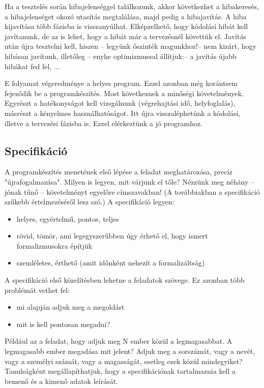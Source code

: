 \documentclass[margin=0px]{article}
\begin{document}
Ha a tesztelés során hibajelenséggel találkozunk, akkor következhet a hibakeresés, a hibajelenséget okozó utasítás megtalálása, majd pedig a hibajavítás. A hiba kijavítása több fázisba is visszanyúlhat. Elképzelhető, hogy kódolási hibát kell javítanunk, de az is lehet, hogy a hibát már a tervezésnél követtük el. Javítás után újra tesztelni kell, hiszen – legyünk őszinték magunkhoz!– nem kizárt, hogy hibásan javítunk, illetőleg – enyhe optimizmussal állítjuk:– a javítás újabb hibákat fed fel, ...

E folyamat végeredménye a helyes program. Ezzel azonban még korántsem fejeződik be a programkészítés. Most következnek a minőségi követelmények. Egyrészt a hatékonyságot kell vizsgálnunk (végrehajtási idő, helyfoglalás), másrészt a kényelmes használhatóságot. Itt újra visszaléphetünk a kódolási, illetve a tervezési fázisba is. Ezzel elérkeztünk a jó programhoz.

\subsection{Specifikáció}
A programkészítés menetének első lépése a feladat meghatározása, precíz "újrafogalmazása". Milyen is legyen, mit várjunk el tőle? Nézzünk meg néhány – jónak tűnő – követelményt egyelőre címszavakban! (A továbbiakban a specifikáció szűkebb értelmezéséről lesz szó.) A specifikáció legyen:

\begin{itemize}
    \item helyes, egyértelmű, pontos, teljes
    \item rövid, tömör, ami legegyszerűbben úgy érhető el, hogy ismert formalizmusokra építjük
    \item szemléletes, érthető (amit időnként nehezít a formalizáltság)
\end{itemize}

A specifikáció első közelítésben lehetne a feladatok szövege. Ez azonban több problémát vethet fel:

\begin{itemize}
    \item mi alapján adjuk meg a megoldást
    \item mit is kell pontosan megadni?
\end{itemize}

Például az a feladat, hogy adjuk meg N ember közül a legmagasabbat. A legmagasabb ember megadása mit jelent? Adjuk meg a sorszámát, vagy a nevét, vagy a személyi számát, vagy a magasságát, esetleg ezek közül mindegyiket?
Tanulságként megállapíthatjuk, hogy a specifikációnak tartalmaznia kell a bemenő és a kimenő adatok leírását.
\end{document}
